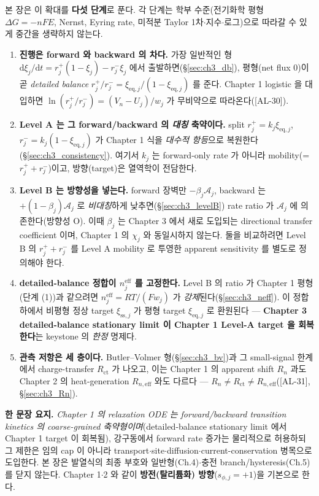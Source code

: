 \documentclass[11pt,a4paper]{article}
\newcommand{\dd}{\mathrm{d}}
\newcommand{\eff}{\mathrm{eff}}
\newcommand{\eq}{\mathrm{eq}}
\newcommand{\ct}{\mathrm{ct}}
\newcommand{\sstat}{\mathrm{ss}}
\newcommand{\AL}[1]{\textsf{[AL-#1]}}
\begin{document}
본 장은 이 확대를 \textbf{다섯 단계}로 푼다. 각 단계는 학부 수준(전기화학 평형 $\Delta G=-nF E$, Nernst,
Eyring rate, 미적분 Taylor 1차$\cdot$지수$\cdot$로그)으로 따라갈 수 있게 중간을 생략하지 않는다.
\begin{enumerate}[label=\textbf{(\arabic*)},leftmargin=2.2em]
\item \textbf{진행은 forward 와 backward 의 차다.} 가장 일반적인 형 $\dd\xi_j/\dd t=r_j^+(1-\xi_j)-r_j^-\xi_j$
  에서 출발하면(\S\ref{sec:ch3_db}), 평형(net flux $0$)이 곧 \emph{detailed balance} $r_j^+/r_j^-=\xi_{\eq,j}/(1-\xi_{\eq,j})$
  를 준다. Chapter 1 logistic 을 대입하면 $\ln(r_j^+/r_j^-)=(V_n-U_j)/w_j$ 가 무비약으로 따라온다(\AL{30}).
\item \textbf{Level A 는 그 forward/backward 의 \emph{대칭} 축약이다.} split $r_j^+=k_j\xi_{\eq,j}$,
  $r_j^-=k_j(1-\xi_{\eq,j})$ 가 Chapter 1 식을 \emph{대수적 항등}으로 복원한다(\S\ref{sec:ch3_consistency}).
  여기서 $k_j$ 는 forward-only rate 가 아니라 mobility(=$r_j^++r_j^-$)이고, 방향(target)은 열역학이 전담한다.
\item \textbf{Level B 는 방향성을 넣는다.} forward 장벽만 $-\beta_j\mathcal A_j$, backward 는 $+(1-\beta_j)\mathcal A_j$
  로 \emph{비대칭}하게 낮추면(\S\ref{sec:ch3_levelB}) rate ratio 가 $\mathcal A_j$ 에 의존한다(방향성 O). 이때
  $\beta_j$ 는 Chapter 3 에서 새로 도입되는 directional transfer coefficient 이며, Chapter 1 의 $\chi_j$ 와
  동일시하지 않는다. 둘을 비교하려면 Level B 의 $r_j^++r_j^-$ 를 Level A mobility 로 투영한 apparent sensitivity 를
  별도로 정의해야 한다.
\item \textbf{detailed-balance 정합이 $n_j^{\eff}$ 를 고정한다.} Level B 의 ratio 가 Chapter 1 평형(단계 (1))과
  같으려면 $n_j^{\eff}=RT/(Fw_j)$ 가 \emph{강제}된다(\S\ref{sec:ch3_neff}). 이 정합 하에서 비평형 정상 target
  $\xi_{\sstat,j}$ 가 평형 target $\xi_{\eq,j}$ 로 환원된다 — \textbf{Chapter 3 detailed-balance stationary limit 이
  Chapter 1 Level-A target 을 회복한다}는 keystone 의 \emph{한정} 명제다.
\item \textbf{관측 저항은 세 층이다.} Butler--Volmer 형(\S\ref{sec:ch3_bv})과 그 small-signal 한계에서
  charge-transfer $R_\ct$ 가 나오고, 이는 Chapter 1 의 apparent shift $R_n$ 과도 Chapter 2 의 heat-generation
  $R_{n,\eff}$ 와도 다르다 — $R_n\ne R_\ct\ne R_{n,\eff}$(\AL{31}, \S\ref{sec:ch3_Rn}).
\end{enumerate}

\noindent\textbf{한 문장 요지.} \emph{Chapter 1 의 relaxation ODE 는 forward/backward transition kinetics 의
coarse-grained 축약형이며}(detailed-balance stationary limit 에서 Chapter 1 target 이 회복됨), 강구동에서 forward rate 증가는
물리적으로 허용하되 그 제한은 임의 cap 이 아니라 transport$\cdot$site$\cdot$diffusion$\cdot$current-conservation
병목으로 도입한다. 본 장은 발열식의 최종 부호와 일반형(Ch.4)$\cdot$충전 branch/hysteresis(Ch.5)를 닫지 않는다.
Chapter 1$\cdot$2 와 같이 \textbf{방전(탈리튬화) 방향}($s_{\phi,j}=+1$)을 기본으로 한다.
\end{document}
